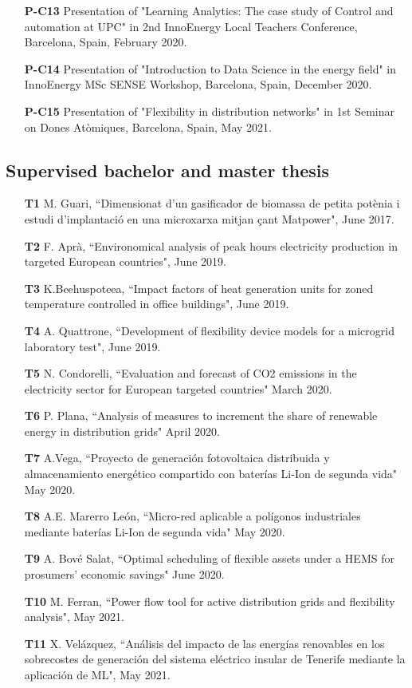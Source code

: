 \begin{itemize}
	\item [\textbf{P-C13}] Presentation of "Learning Analytics: The case study of Control and automation at UPC" in 2nd InnoEnergy Local Teachers Conference, Barcelona, Spain, February 2020.
	\item [\textbf{P-C14}] Presentation of "Introduction to Data Science in the energy field" in InnoEnergy MSc SENSE Workshop, Barcelona, Spain, December 2020.
	\item [\textbf{P-C15}] Presentation of "Flexibility in distribution networks" in 1st Seminar on Dones At\`{o}miques, Barcelona, Spain, May 2021.
\end{itemize}

\subsection*{Supervised bachelor and master thesis}

\begin{itemize}
	\item [\textbf{T1}] M. Guari, ``Dimensionat d'un gasificador de biomassa de petita pot\`{e}nia i estudi d'implantaci\'{o} en una microxarxa mitjan \c{c}ant Matpower", June 2017.
	\item [\textbf{T2}] F. Apr\`{a}, ``Environomical analysis of peak hours electricity production in targeted European countries", June 2019.
	\item [\textbf{T3}] K.Beehuspoteea,  ``Impact factors of heat generation units for zoned temperature controlled in office buildings", June 2019.
	\item [\textbf{T4}] A. Quattrone, ``Development of flexibility device models for a microgrid laboratory test", June 2019. 
	\item [\textbf{T5}] N. Condorelli, ``Evaluation and forecast of CO2 emissions in the
electricity sector for European targeted countries" March 2020.
	\item [\textbf{T6}] P. Plana, ``Analysis of measures to increment the share of renewable energy in distribution grids" April 2020.
	\item [\textbf{T7}] A.Vega, ``Proyecto de generaci\'{o}n fotovoltaica distribuida y almacenamiento energ\'{e}tico compartido con bater\'{i}as Li-Ion de segunda vida" May 2020.
	\item [\textbf{T8}] A.E. Marerro Le\'{o}n, ``Micro-red aplicable a pol\'{i}gonos industriales mediante bater\'{i}as Li-Ion de segunda vida" May 2020.
	\item [\textbf{T9}] A. Bov\'{e} Salat, ``Optimal scheduling of flexible assets under a HEMS for prosumers' economic savings" June 2020. 
	\item [\textbf{T10}] M. Ferran, ``Power flow tool for active distribution grids and flexibility analysis", May 2021. 
	\item [\textbf{T11}] X. Vel\'{a}zquez, ``An\'{a}lisis del impacto de las energ\'{i}as renovables en los sobrecostes de generaci\'{o}n del sistema el\'{e}ctrico insular de Tenerife mediante la aplicaci\'{o}n de ML", May 2021. 
	 
\end{itemize}

